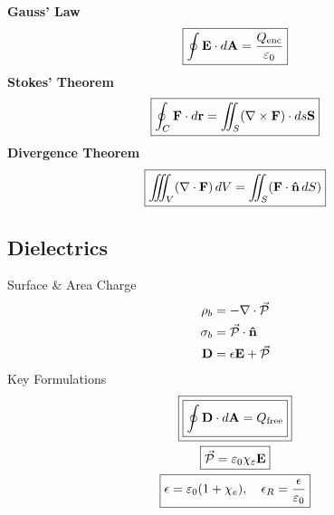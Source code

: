 


\noindent
\textbf{Gauss' Law}
\begin{gather*}
	\boxed{\oint {\mathbf{E}}\cdot d{\mathbf{A}} = \frac{Q_\text{enc}}{\varepsilon_0}}
\end{gather*}
\textbf{Stokes' Theorem}
\begin{gather*}
	\boxed{\oint_C \gvec{F}\cdot d\gvec{r} = \int\hspace{-0.27cm}\int_S(\nabla\times \gvec{F})\cdot ds\gvec{S}}
\end{gather*}
\textbf{Divergence Theorem}
\begin{gather*}
	\boxed{\giiint_V(\nabla\cdot \gvec{F})\,dV = \int\hspace{-0.26cm} \int_S(\gvec{F}\cdot\unit{n}\,dS)}
\end{gather*}

\subsection*{Dielectrics}
\begin{problem}
	Surface \& Area Charge
	\begin{align*}
		\rho_b &= -\nabla \cdot {\mathcal{\vec{P}}}\\
		\sigma_b &= {\mathcal{\vec{P}}}\cdot\mathbf{\hat{n}}\\
		{\mathbf{D}} &= \epsilon {\mathbf{E}} + {\mathcal{\vec{P}}}
	\end{align*}
	Key Formulations
	\begin{gather*}
		\boxed{\boxed{\oint {\mathbf{D}}\cdot d{\mathbf{A}} = Q_\text{free}}}\\
		\boxed{{\mathcal{\vec{P}}}=\varepsilon_0\chi_\varepsilon{\mathbf{E}}}\\
		\boxed{\epsilon = \varepsilon_0 (1 + \chi_e),\quad \epsilon_R = \frac{\epsilon}{\varepsilon_0}}
	\end{gather*}
\end{problem}

